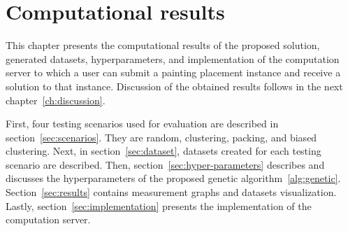 \chapter{Computational results}\label{ch:computational-results}

This chapter presents the computational results of the proposed solution,
generated datasets, hyperparameters,
and implementation of the computation server
to which a user can submit a painting placement instance
and receive a solution to that instance.
Discussion of the obtained results follows in the next chapter~\ref{ch:discussion}.

First, four testing scenarios used for evaluation are described in
section~\ref{sec:scenarios}.
They are random, clustering, packing, and biased clustering.
Next, in section~\ref{sec:dataset}, datasets created for each testing scenario are described.
Then, section~\ref{sec:hyper-parameters} describes and discusses
the hyperparameters of the proposed genetic algorithm~\ref{alg:genetic}.
Section~\ref{sec:results} contains measurement graphs and datasets visualization.
Lastly, section~\ref{sec:implementation} presents the implementation of the computation server.







